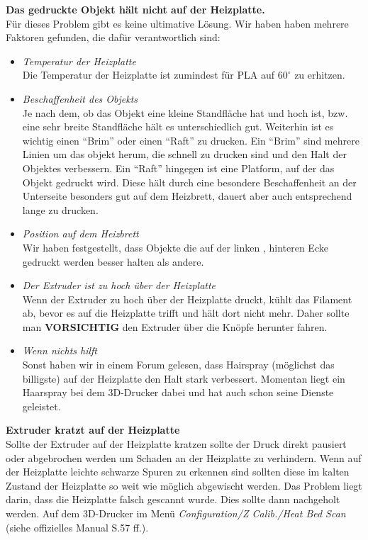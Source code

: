 \documentclass[11pt,a4paper]{scrartcl}
\begin{document}
\begin{description}
\item \textbf{Das gedruckte Objekt hält nicht auf der Heizplatte.}\\
Für dieses Problem gibt es keine ultimative Lösung. Wir haben haben mehrere Faktoren gefunden, die dafür verantwortlich sind:
\begin{itemize}
\item \textit{Temperatur der Heizplatte}\\
Die Temperatur der Heizplatte ist zumindest für PLA auf $60^\circ$ zu erhitzen.
\item \textit{Beschaffenheit des Objekts}\\
Je nach dem, ob das Objekt eine kleine Standfläche hat und hoch ist, bzw. eine sehr breite Standfläche hält es unterschiedlich gut. Weiterhin ist es wichtig einen \enquote{Brim} oder einen \enquote{Raft} zu drucken. Ein \enquote{Brim} sind mehrere Linien um das objekt herum, die schnell zu drucken sind und den Halt der Objektes verbessern. Ein \enquote{Raft} hingegen ist eine Platform, auf der das Objekt gedruckt wird. Diese hält durch eine besondere Beschaffenheit an der Unterseite besonders gut auf dem Heizbrett, dauert aber auch entsprechend lange zu drucken.
\item \textit{Position auf dem Heizbrett}\\
Wir haben festgestellt, dass Objekte die auf der linken , hinteren Ecke gedruckt werden besser halten als andere.
\item \textit{Der Extruder ist zu hoch über der Heizplatte}\\
Wenn der Extruder zu hoch über der Heizplatte druckt, kühlt das Filament ab, bevor es auf die Heizplatte trifft und hält dort nicht mehr. Daher sollte man \textbf{VORSICHTIG} den Extruder über die Knöpfe herunter fahren.
\item \textit{Wenn nichts hilft}\\
Sonst haben wir in einem Forum gelesen, dass Hairspray (möglichst das billigste) auf der Heizplatte den Halt stark verbessert. Momentan liegt ein Haarspray bei dem 3D-Drucker dabei und hat auch schon seine Dienste geleistet.
\end{itemize}
\vspace{10pt}

\item \textbf{Extruder kratzt auf der Heizplatte}\\
Sollte der Extruder auf der Heizplatte kratzen sollte der Druck direkt pausiert oder abgebrochen werden um Schaden an der Heizplatte zu verhindern. Wenn auf der Heizplatte leichte schwarze Spuren zu erkennen sind sollten diese im kalten Zustand der Heizplatte so weit wie möglich abgewischt werden. Das Problem liegt darin, dass die Heizplatte falsch gescannt wurde. Dies sollte dann nachgeholt werden. Auf dem 3D-Drucker im Menü \textit{Configuration/Z Calib./Heat Bed Scan} (siehe offizielles Manual S.57 ff.).
\end{description}
\end{document}
